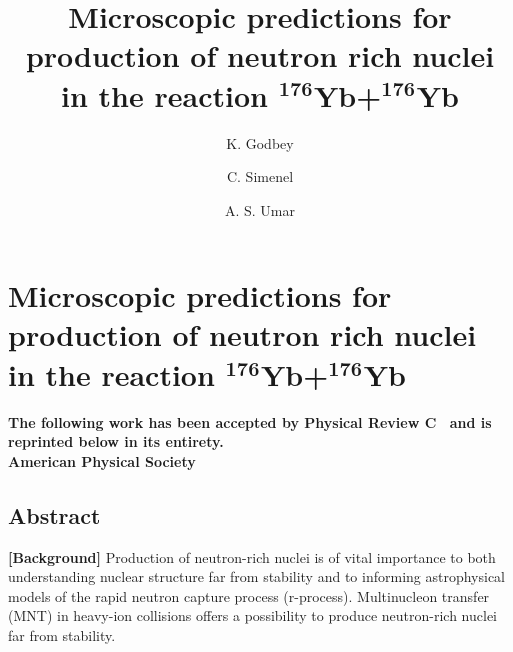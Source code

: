 
\chapter{Microscopic predictions for production of neutron rich nuclei in the reaction $^\mathbf{176}\mathbf{Yb}$+${}^\mathbf{176}\mathbf{Yb}$}\label{chapters:chapter_8}

\title{Microscopic predictions for production of neutron rich nuclei in the reaction $^\mathbf{176}\mathbf{Yb}$+${}^\mathbf{176}\mathbf{Yb}$}

\author[1]{K. Godbey}
\author[2]{C. Simenel}
\author[1]{A. S. Umar}


{

	\makeatletter

	\begin{center}
		\AB@authlist
		\AB@affillist
	\end{center}
	\makeatother
	
	\bfseries\centering
	The following work has been accepted by Physical Review C~\citep{godbey2020b} and is reprinted below in its entirety.\\
	 American Physical Society\\
}
\makeatletter
\renewcommand{\AB@affillist}{}
\renewcommand{\AB@authlist}{}
\setcounter{authors}{0}
\makeatother


\section*{Abstract}

		{\bf [Background]}
		Production of neutron-rich nuclei is of vital importance to both understanding nuclear structure far from stability and to informing astrophysical models of the rapid neutron capture process (r-process). Multinucleon transfer (MNT) in heavy-ion collisions offers a possibility to produce neutron-rich nuclei far from stability.
		
